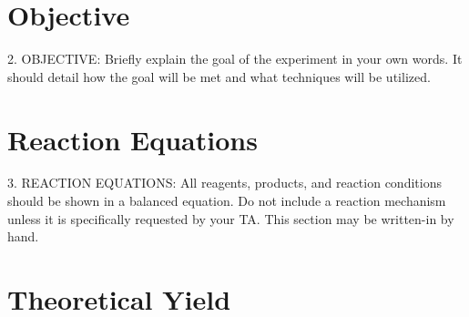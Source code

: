 \documentclass[letterpaper,amsmath,amssymb,prb,preprint,12pt]{revtex4-1}%
\begin{document}


\newpage



\section{Objective}


2. OBJECTIVE: Briefly explain the goal of the experiment in your own words. It
should detail how the goal will be met and what techniques will be utilized.

\section{Reaction Equations}


3. REACTION EQUATIONS: All reagents, products, and reaction conditions should
be shown in a balanced equation. Do not include a reaction mechanism unless it is
specifically requested by your TA. This section may be written-in by hand.

\section{Theoretical Yield}

\end{document}
